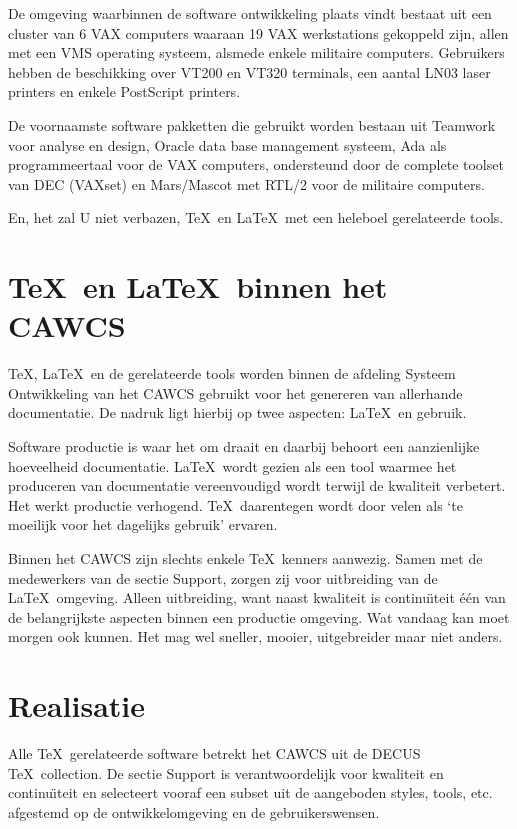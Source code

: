 De omgeving waarbinnen de software ontwikkeling plaats vindt bestaat uit een
cluster van 6 VAX computers waaraan 19 VAX werkstations gekoppeld zijn, allen
met een VMS operating systeem, alsmede enkele militaire computers. Gebruikers
hebben de beschikking over VT200 en VT320 terminals, een aantal LN03 laser
printers en enkele PostScript printers.

De voornaamste software pakketten die gebruikt worden bestaan uit Teamwork voor
analyse en design, Oracle data base management systeem, Ada als programmeertaal
voor de VAX computers, ondersteund door de complete toolset van DEC (VAXset) en
Mars/Mascot met RTL/2 voor de militaire computers. 

En, het zal U niet verbazen, \TeX\ en \LaTeX\ met een heleboel gerelateerde
tools.

\section{\TeX\ en \LaTeX\ binnen het CAWCS}

\TeX, \LaTeX\ en de gerelateerde tools worden binnen de afdeling Systeem
Ontwikkeling van het CAWCS gebruikt voor het genereren van allerhande
documentatie. De nadruk ligt hierbij op twee aspecten: \LaTeX\ en gebruik.

Software productie is waar het om draait en daarbij behoort een aanzienlijke
hoeveelheid documentatie. \LaTeX\ wordt gezien als een tool waarmee het
produceren van documentatie vereenvoudigd wordt terwijl de kwaliteit verbetert.
Het werkt productie verhogend. \TeX\ daarentegen wordt door velen als `te
moeilijk voor het dagelijks gebruik' ervaren. 

Binnen het CAWCS zijn slechts enkele \TeX\ kenners aanwezig. Samen met de
medewerkers van de sectie Support, zorgen zij voor uitbreiding van de \LaTeX\
omgeving. Alleen uitbreiding, want naast kwaliteit is continu\"{\i}teit \'e\'en
van de belangrijkste aspecten binnen een productie omgeving. Wat vandaag kan
moet morgen ook kunnen. Het mag wel sneller, mooier, uitgebreider maar niet
anders.

\section{Realisatie}

Alle \TeX\ gerelateerde software betrekt het CAWCS uit de DECUS \TeX\
collection. De sectie Support is verantwoordelijk voor kwaliteit en
continu\"{\i}teit en selecteert vooraf een subset uit de aangeboden styles,
tools, etc. afgestemd op de ontwikkelomgeving en de gebruikerswensen.

